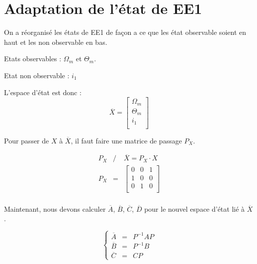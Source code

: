 \section{Adaptation de l'état de EE1}
On a réorganisé les états de EE1 de façon a ce que les état observable soient en haut et les non observable en bas.

\noindent\textbullet\hspace{2mm} Etats observables : $\Omega_m$ et $ \Theta_m$.

\noindent\textbullet\hspace{2mm} Etat non observable : $i_1$

\noindent\textbullet\hspace{2mm} L'espace d'état est donc : 
\begin{equation}
\overline{X} = \begin{bmatrix}
\Omega_m\\
\Theta_m\\
i_1\\
\end{bmatrix}
\end{equation}


Pour passer de $X$ à $\overline{X}$, il faut faire une matrice de passage $P_X$.

 \begin{eqnarray}
 P_X &/&  \overline{X} =P_X \cdot X \\
 P_X &=&\begin{bmatrix}
 0 & 0 & 1 \\
 1 & 0 & 0 \\
 0 & 1 & 0 \\
\end{bmatrix}  \\
 \end{eqnarray}

Maintenant, nous devons calculer $\overline{A}$, $\overline{B}$, $\overline{C}$, $\overline{D}$ pour le nouvel espace d'état lié à $\overline{X}$.

\begin{equation}%
	\left\lbrace%
	\begin{matrix}
		\overline{A} &=& P^{-1} A P \\%
		\overline{B} &=& P^{-1} B \\%
		\overline{C} &=& C P%
	\end{matrix}
\right.%
\end{equation}
